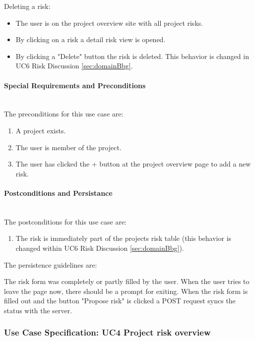 Deleting a risk:
\begin{itemize}
	\setlength\itemsep{-1.5em}
	\item The user is on the project overview site with all project risks.
	\item By clicking on a risk a detail risk view is opened.
	\item By clicking a "Delete" button the risk is deleted. This behavior is changed in UC6 Risk Discussion \ref{sec:domainBbg}.
\end{itemize}

\paragraph*{Special Requirements and Preconditions}\mbox{}\\
The preconditions for this use case are:
\begin{enumerate}
	\setlength\itemsep{-1.5em}
	\item A project exists.
	\item The user is member of the project.
	\item The user has clicked the + button at the project overview page to add a new risk.
\end{enumerate}

\paragraph*{Postconditions and Persistance}\mbox{}\\
The postconditions for this use case are:
\begin{enumerate}
	\setlength\itemsep{-1.5em}
	\item The risk is immediately part of the projects risk table (this behavior is changed within UC6 Risk Discussion \ref{sec:domainBbg}).
\end{enumerate}

The persistence guidelines are: 

The risk form was completely or partly filled by the user. When the user tries to leave the page now, there should be a prompt for exiting. When the risk form is filled out and the button "Propose risk" is clicked a POST request syncs the status with the server.

\newpage
\subsubsection{Use Case Specification: \ac{UC}4 Project risk overview}
\label{sec:domainBbe}

